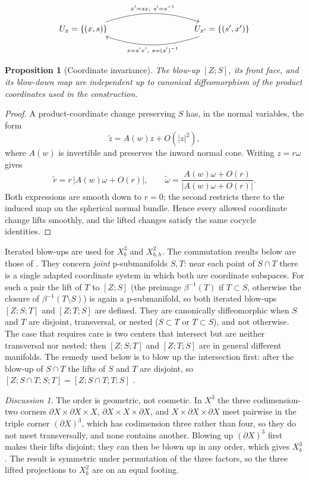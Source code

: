\documentclass[12pt,oneside,reqno]{article}
\theoremstyle{plain}
\newtheorem{proposition}[theorem]{Proposition}
\theoremstyle{definition}
\theoremstyle{remark}
\newtheorem*{discussion}{Discussion}
\begin{document}
\[
\begin{tikzcd}[column sep=huge,row sep=large]
 U_x=\{(x,s)\}
 \arrow[rr,bend left=18,"{x'=sx,\ s'=s^{-1}}"]
 &&
 U_{x'}=\{(s',x')\}
 \arrow[ll,bend left=18,"{x=s'x',\ s=(s')^{-1}}"]
\end{tikzcd}
\]

\begin{proposition}[Coordinate invariance]
The blow-up \([Z;S]\), its front face, and its blow-down map are
independent up to canonical diffeomorphism of the product coordinates
used in the construction.
\end{proposition}

\begin{proof}
A product-coordinate change preserving \(S\) has, in the normal
variables, the form
\[
 \widetilde z=A(w)z+O(|z|^2),
\]
where \(A(w)\) is invertible and preserves the inward normal cone.
Writing \(z=r\omega\) gives
\[
 \widetilde r
 =r\,|A(w)\omega+O(r)|,\qquad
 \widetilde\omega
 =\frac{A(w)\omega+O(r)}
 {|A(w)\omega+O(r)|}.
\]
Both expressions are smooth down to \(r=0\); the second restricts there
to the induced map on the spherical normal bundle. Hence every allowed
coordinate change lifts smoothly, and the lifted changes satisfy the
same cocycle identities.
\end{proof}

Iterated blow-ups are used for \(X_b^3\) and \(X_{b,h}^2\). The
commutation results below are those of
\cite[Lecture~2, \S\S3, 5]{MelroseBlowup}. They concern \emph{joint}
p-submanifolds \(S,T\): near each point of \(S\cap T\) there is a single
adapted coordinate system in which both are coordinate subspaces. For such
a pair the lift of \(T\) to \([Z;S]\) (the preimage \(\beta^{-1}(T)\) if
\(T\subset S\), otherwise the closure of \(\beta^{-1}(T\setminus S)\)) is
again a p-submanifold, so both iterated blow-ups \([Z;S;T]\) and
\([Z;T;S]\) are defined. They are canonically diffeomorphic when \(S\) and
\(T\) are disjoint, transversal, or nested (\(S\subset T\) or
\(T\subset S\)), and not otherwise. The case that requires care is two
centers that intersect but are neither transversal nor nested: then
\([Z;S;T]\) and \([Z;T;S]\) are in general different manifolds. The remedy
used below is to blow up the intersection first: after the blow-up of
\(S\cap T\) the lifts of \(S\) and \(T\) are disjoint, so
\([Z;S\cap T;S;T]=[Z;S\cap T;T;S]\) \cite[(2.15)]{MelroseBlowup}.

\begin{discussion}
The order is geometric, not cosmetic. In \(X^3\) the three codimension-two
corners \(\partial X\times\partial X\times X\),
\(\partial X\times X\times\partial X\), and
\(X\times\partial X\times\partial X\) meet pairwise in the triple corner
\((\partial X)^3\), which has codimension three rather than four, so they
do not meet transversally, and none contains another. Blowing up
\((\partial X)^3\) first makes their lifts disjoint; they can then be
blown up in any order, which gives \(X_b^3\)
\cite[(2.31)]{MelroseBlowup}. The result is symmetric under permutation of
the three factors, so the three lifted projections to \(X_b^2\) are on an
equal footing.
\end{discussion}
\end{document}
